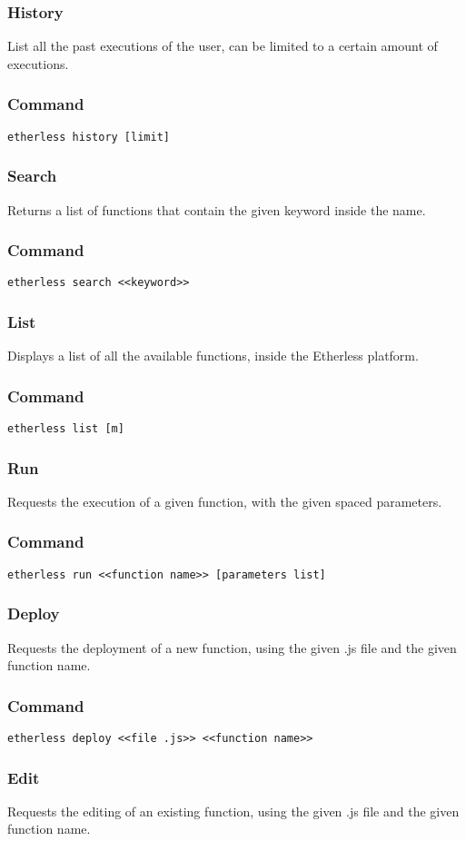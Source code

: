 \subsubsection{History}
List all the past executions of the user, can be limited to a certain amount of executions.
\subsubsection*{Command}
\texttt{etherless history [limit]}
\subsubsection{Search}
Returns a list of functions that contain the given keyword inside the name.
\subsubsection*{Command}
\texttt{etherless search <<keyword>>}
\subsubsection{List}
Displays a list of all the available functions, inside the Etherless platform.
\subsubsection*{Command}
\texttt{etherless list [m]}
\subsubsection{Run}
Requests the execution of a given function, with the given spaced parameters.
\subsubsection*{Command}
\texttt{etherless run <<function name>> [parameters list]}
\subsubsection{Deploy}
Requests the deployment of a new function, using the given .js file and the given function name. 
\subsubsection*{Command}
\texttt{etherless deploy <<file .js>> <<function name>>}
\subsubsection{Edit}
Requests the editing of an existing function, using the given .js file and the given function name. 
